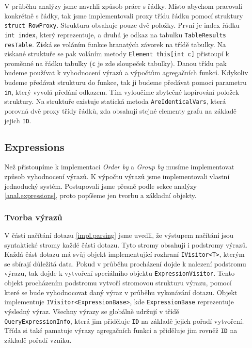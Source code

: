 V průběhu analýzy jsme navrhli způsob práce s řádky. 
Místo abychom pracovali konkrétně s řádky, tak jsme implementovali proxy třídu řádku pomocí struktury \texttt{struct RowProxy}.
Struktura obsahuje pouze dvě položky. 
První je index řádku \texttt{int index}, který reprezentuje, a druhá je odkaz na tabulku \texttt{TableResults resTable}.
Získá se voláním funkce hranatých závorek na třídě tabulky.
Na získané struktuře se pak voláním metody \texttt{Element this[int c]} přistoupí k proměnné na řádku tabulky (\texttt{c} je zde sloupeček tabulky).
Danou třídu pak budeme používat k vyhodnocení výrazů a výpočtům agregačních funkcí.
Kdykoliv budeme předávat strukturu do funkce, tak ji budeme předávat pomocí parametru \texttt{in}, který vyvolá předání odkazem.
Tím vyloučíme zbytečné kopírování položek struktury.
Na struktuře existuje statická metoda \texttt{AreIdenticalVars}, která porovná dvě proxy třídy řádků, zda obsahují stejné elementy grafu na základě jejich \texttt{ID}.

\subsection{Expressions}

Než přistoupíme k implementaci \textit{Order by} a \textit{Group by} musíme implementovat způsob vyhodnocení výrazů.
K výpočtu výrazů jsme implementovali vlastní jednoduchý systém.
Postupovali jsme přesně podle sekce analýzy \ref{anal.expressions}, proto popíšeme jen tvorbu a základní objekty.

\subsubsection{Tvorba výrazů}

V části načítání dotazu \ref{impl.parsing} jsme uvedli, že výstupem načítání jsou syntaktické stromy každé části dotazu.
Tyto stromy obsahují i podstromy výrazů.
Každá část dotazu má svůj objekt implementující rozhraní \texttt{IVisitor<T>}, kterým se sbírají důležitá data.
Pokud v průběhu procházení dojde k nalezení podstromu výrazu, tak dojde k vytvoření speciálního objektu \texttt{ExpressionVisitor}.
Tento objekt procházením podstromu vytvoří stromovou strukturu výrazu, pomocí které se bude vyhodnocovat daný výraz v průběhu vykonávání dotazu.
Objekt implementuje \texttt{IVisitor<ExpressionBase>}, kde \texttt{ExpressionBase} reprezentuje výsledný výraz.
Všechny výrazy se globálně udržují v třídě \texttt{QueryExpressionInfo}, která jim přiděluje \texttt{ID} na základě jejich pořadí vytvoření.
Třída si také pamatuje výrazy agregačních funkcí a přiděluje jim rovněž \texttt{ID} na základě pořadí vzniku.

